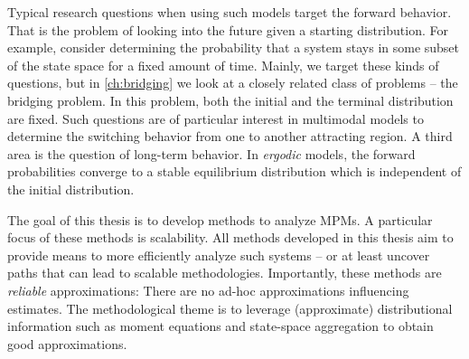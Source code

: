 Typical research questions when using such models target the forward behavior.
That is the problem of looking into the future given a starting distribution.
For example, consider determining the probability that a system stays in some subset of the state space for a fixed amount of time.
Mainly, we target these kinds of questions, but in \autoref{ch:bridging} we look at a closely related class of problems -- the bridging problem.
In this problem, both the initial and the terminal distribution are fixed.
Such questions are of particular interest in multimodal models to determine the switching behavior from one to another attracting region.
A third area is the question of long-term behavior.
In \emph{ergodic} models, the forward probabilities converge to a stable equilibrium distribution which is independent of the initial distribution.

The goal of this thesis is to develop methods to analyze \acp{MPM}.
A particular focus of these methods is scalability.
All methods developed in this thesis aim to provide means to more efficiently analyze such systems -- or at least uncover paths that can lead to scalable methodologies.
Importantly, these methods are \emph{reliable} approximations: There are no ad-hoc approximations influencing estimates.
The methodological theme is to leverage (approximate) distributional information such as moment equations and state-space aggregation to obtain good approximations.

